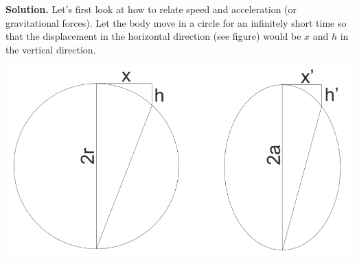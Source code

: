 \documentclass[11pt]{article}
\begin{document}
\textbf{Solution.}  Let's first look at how to relate speed and acceleration (or gravitational forces). Let the body move in a circle for an infinitely short time so that the displacement in the horizontal direction (see figure) would be $x$ and $h$ in the vertical direction.

\begin{center}
    \includegraphics[width=0.6\linewidth]{Images/CM3.png}
\end{center}
\end{document}
